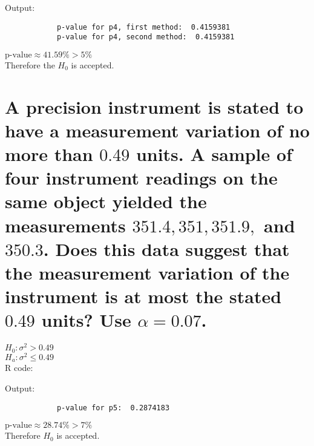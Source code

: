 \documentclass[10pt, letterpaper, titlepage]{article}
\newcommand{\pv}{\text{p-value}}
\begin{document}
        \noindent
        Output:
        \begin{verbatim}
            p-value for p4, first method:  0.4159381 
            p-value for p4, second method:  0.4159381 
        \end{verbatim}

        \noindent
        $\pv \approx 41.59\% > 5\%$\\
        Therefore the $H_0$ is accepted.

    \newpage
    \section{A precision instrument is stated to have a measurement variation of no more than $0.49$
        units. A sample of four instrument readings on the same object yielded the measurements 
        $351.4, 351, 351.9,$ and $350.3$. Does this data suggest that the measurement variation of 
        the instrument is at most the stated $0.49$ units? Use $\alpha = 0.07$.}
        $H_0: \sigma^2 > 0.49$\\
        $H_a: \sigma^2 \leq 0.49$\\
        R code:

        

        \noindent
        Output:
        \begin{verbatim}
            p-value for p5:  0.2874183
        \end{verbatim}
        
        \noindent
        $\pv \approx 28.74\% > 7\%$\\
        Therefore $H_0$ is accepted.

\end{document}
